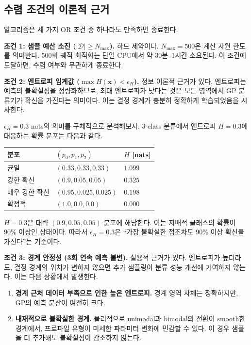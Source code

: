 \documentclass[11pt]{article}
\begin{document}
\subsection{수렴 조건의 이론적 근거}

알고리즘은 세 가지 OR 조건 중 하나라도 만족하면 종료한다.

\textbf{조건 1: 샘플 예산 소진 ($|\mathcal{D}| \geq N_{\text{max}}$).} 하드 제약이다. $N_{\text{max}} = 500$은 계산 자원 한도를 의미한다. 500회 궤적 최적화는 단일 CPU에서 약 30분--1시간 소요된다. 이 조건에 도달하면, 수렴 여부와 무관하게 종료한다.

\textbf{조건 2: 엔트로피 임계값 ($\max H(\mathbf{x}) < \epsilon_H$).} 정보 이론적 근거가 있다. 엔트로피는 예측의 불확실성을 정량화하므로, 최대 엔트로피가 낮다는 것은 모든 영역에서 GP 분류기가 확신을 가진다는 의미이다. 이는 결정 경계가 충분히 정확하게 학습되었음을 시사한다.

$\epsilon_H = 0.3$ nats의 의미를 구체적으로 분석해보자. 3-class 분류에서 엔트로피 $H = 0.3$에 대응하는 확률 분포는 다음과 같다.

\begin{table}[htbp]
\centering
\small
\begin{tabular}{@{}lll@{}}
\toprule
분포 & $(p_0, p_1, p_2)$ & $H$ [nats] \\
\midrule
균일 & $(0.33, 0.33, 0.33)$ & $1.099$ \\
강한 확신 & $(0.9, 0.05, 0.05)$ & $0.325$ \\
매우 강한 확신 & $(0.95, 0.025, 0.025)$ & $0.198$ \\
확정적 & $(1.0, 0.0, 0.0)$ & $0.000$ \\
\bottomrule
\end{tabular}
\end{table}

$H = 0.3$은 대략 $(0.9, 0.05, 0.05)$ 분포에 해당한다. 이는 지배적 클래스의 확률이 90\% 이상인 상태이다. 따라서 $\epsilon_H = 0.3$은 ``가장 불확실한 점조차도 90\% 이상 확신을 가진다''는 기준이다.

\textbf{조건 3: 경계 안정성 (3회 연속 예측 불변).} 실용적 근거가 있다. 엔트로피가 높더라도, 결정 경계의 위치가 변하지 않으면 추가 샘플링이 분류 성능 개선에 기여하지 않는다. 이는 다음 상황에서 발생한다.

\begin{enumerate}[label=\arabic*.]
  \item \textbf{경계 근처 데이터 부족으로 인한 높은 엔트로피.} 경계 영역 자체는 정확하지만, GP의 예측 분산이 여전히 크다.
  \item \textbf{내재적으로 불확실한 경계.} 물리적으로 unimodal과 bimodal의 전환이 smooth한 경계에서, 프로파일 유형이 미세한 파라미터 변화에 민감할 수 있다. 이 경우 샘플을 더 추가해도 불확실성이 감소하지 않는다.
\end{enumerate}
\end{document}
